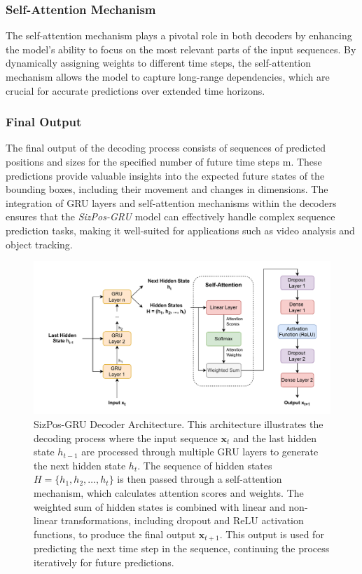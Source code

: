 \documentclass[12pt,oneside]{book} %
\begin{document}
\subsubsection{Self-Attention Mechanism}
The self-attention mechanism plays a pivotal role in both decoders by enhancing
the model’s ability to focus on the most relevant parts of the input sequences.
By dynamically assigning weights to different time steps, the self-attention
mechanism allows the model to capture long-range dependencies, which are
crucial for accurate predictions over extended time horizons.

\subsubsection{Final Output}
The final output of the decoding process consists of sequences of predicted
positions and sizes for the specified number of future time steps m. These
predictions provide valuable insights into the expected future states of the
bounding boxes, including their movement and changes in dimensions. The
integration of GRU layers and self-attention mechanisms within the decoders
ensures that the \textit{SizPos-GRU} model can effectively handle complex
sequence prediction tasks, making it well-suited for applications such as video
analysis and object tracking.

\begin{figure}[H]
    \centering
    \includegraphics[width=1\textwidth]{figures/GRUSizPosDecoder.drawio.pdf}
    \caption{SizPos-GRU Decoder Architecture. This architecture illustrates the decoding process where the input sequence \( \mathbf{x}_t \) and the last hidden state \( h_{t-1} \) are processed through multiple GRU layers to generate the next hidden state \( h_t \). The sequence of hidden states \( H = \{h_1, h_2, \dots, h_t\} \) is then passed through a self-attention mechanism, which calculates attention scores and weights. The weighted sum of hidden states is combined with linear and non-linear transformations, including dropout and ReLU activation functions, to produce the final output \( \mathbf{x}_{t+1} \). This output is used for predicting the next time step in the sequence, continuing the process iteratively for future predictions.}
    \label{fig:sizpos-gru-decoder}
\end{figure}
\end{document}
